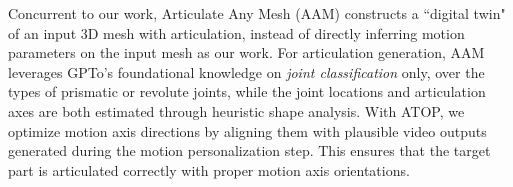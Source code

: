 Concurrent to our work, Articulate Any Mesh (AAM) \cite{qiu2025articulate} constructs a ``digital twin" of an input 3D mesh with articulation, instead of directly inferring motion parameters on the input mesh as our work. For articulation generation, AAM leverages GPTo’s foundational knowledge on {\em joint classification} only, over the types of prismatic or revolute joints, while the joint locations and articulation axes are both estimated through heuristic shape analysis. %
With ATOP, we optimize motion axis directions by aligning them with plausible video outputs generated during the motion personalization step. This ensures that the target part is articulated correctly with proper motion axis orientations.
